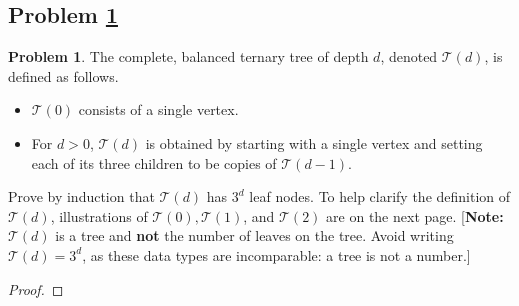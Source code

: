 \documentclass[11pt]{article}
\theoremstyle{definition}
\theoremstyle{definition}
\newtheorem{required}{Problem}
\theoremstyle{definition}
\begin{document}
\newpage
\subsection{Problem \ref{Induction3}}
\begin{required} \label{Induction3}
The complete, balanced ternary tree of depth $d$, denoted $\mathcal{T}(d)$, is defined as follows. 
\begin{itemize}
\item $\mathcal{T}(0)$ consists of a single vertex.
\item For $d > 0$, $\mathcal{T}(d)$ is obtained by starting with a single vertex and setting each of its three children to be copies of $\mathcal{T}(d-1)$.
\end{itemize}

\noindent Prove by induction that $\mathcal{T}(d)$ has $3^{d}$ leaf nodes. To help clarify the definition of $\mathcal{T}(d)$, illustrations of $\mathcal{T}(0), \mathcal{T}(1)$, and $\mathcal{T}(2)$ are on the next page. [\textbf{Note:} $\mathcal{T}(d)$ is a tree and \textbf{not} the number of leaves on the tree. Avoid writing $\mathcal{T}(d) = 3^{d}$, as these data types are incomparable: a tree is not a number.]
\end{required}

\begin{proof}
\end{proof}
\end{document}
